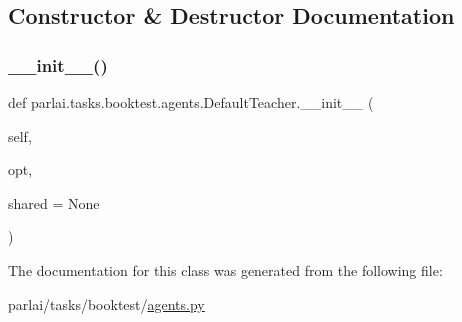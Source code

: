 \subsection{Constructor \& Destructor Documentation}
\mbox{\label{classparlai_1_1tasks_1_1booktest_1_1agents_1_1DefaultTeacher_a22c8ec41b8b29da86546fe666a3016b0}} 
\subsubsection{\texorpdfstring{\+\_\+\+\_\+init\+\_\+\+\_\+()}{\_\_init\_\_()}}
{\footnotesize\ttfamily def parlai.\+tasks.\+booktest.\+agents.\+Default\+Teacher.\+\_\+\+\_\+init\+\_\+\+\_\+ (\begin{DoxyParamCaption}\item[{}]{self,  }\item[{}]{opt,  }\item[{}]{shared = {\ttfamily None} }\end{DoxyParamCaption})}



The documentation for this class was generated from the following file\+:\begin{DoxyCompactItemize}
\item 
parlai/tasks/booktest/\hyperlink{parlai_2tasks_2booktest_2agents_8py}{agents.\+py}\end{DoxyCompactItemize}
